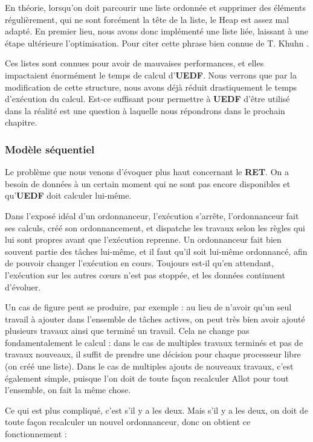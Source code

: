 		
		En théorie, lorsqu'on doit parcourir une liste ordonnée et supprimer des éléments régulièrement, 
		qui ne sont forcément la tête de la liste, le Heap est assez mal adapté. En premier lieu, 
		nous avons donc implémenté une liste liée, laissant à une étape ultérieure l'optimisation. 
		Pour citer cette phrase bien connue de T. Khuhn .
		
		Ces listes sont connues pour avoir de mauvaises 
		performances, et elles impactaient énormément le temps de calcul d'\textbf{UEDF}. 
		Nous verrons que par la modification de cette structure, nous avons déjà réduit drastiquement 
		le temps d'exécution du calcul. Est-ce suffisant pour permettre à \textbf{UEDF} d'être utilisé dans la réalité est une question à laquelle nous répondrons dans le prochain chapitre.
		
	\subsubsection{Modèle séquentiel}
	
		Le problème que nous venons d'évoquer plus haut concernant le \textbf{RET}. On a besoin de données 
		à un certain moment qui ne sont pas encore disponibles et qu'\textbf{UEDF} doit calculer lui-même. 
		
		Dans l'exposé idéal d'un ordonnanceur, l'exécution s'arrête, l'ordonnanceur fait ses calculs, créé son 
		ordonnancement, et dispatche les travaux selon les règles qui lui sont propres avant que l'exécution reprenne. 
		Un ordonnanceur fait bien souvent partie des tâches lui-même, et il faut qu'il soit lui-même ordonnancé, 
		afin de pouvoir changer l'exécution en cours. Toujours est-il qu'en attendant, l'exécution sur les autres cœurs 
		n'est pas stoppée, et les données continuent d'évoluer. 
		
		Un cas de figure peut se produire, par exemple : au lieu de n'avoir qu'un seul travail à ajouter dans 
		l'ensemble de tâches actives, on peut très bien avoir ajouté plusieurs travaux ainsi que terminé un travail.
		Cela ne change pas fondamentalement le calcul : dans le cas de multiples travaux terminés et pas de travaux nouveaux, 
		il suffit de prendre une décision pour chaque processeur libre (on créé une liste).
		Dans le cas de multiples ajouts de nouveaux travaux, c'est également simple, puisque l'on 
		doit de toute façon recalculer Allot pour tout l'ensemble, on fait la même chose. 
		
		Ce qui est plus compliqué, c'est s'il y a les deux. Mais s'il y a les deux, on doit 
		de toute façon recalculer un nouvel ordonnanceur, donc on obtient ce fonctionnement :
		
